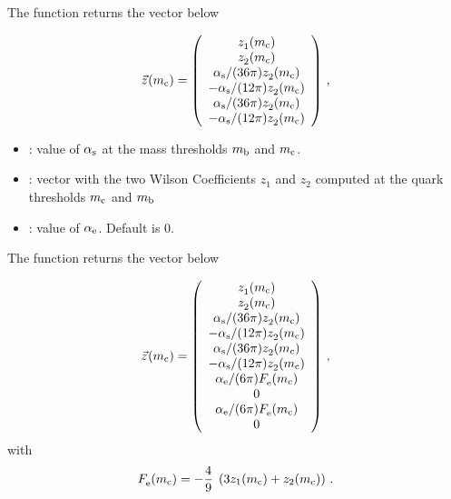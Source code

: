 The function  returns the vector below

\begin{equation}
\vec{z}^{\rm }(m_{\mathrm c}) =
\left( \begin{array}{c}
z_1^{\rm }(m_{\mathrm c}) \\ z_2^{\rm }(m_{\mathrm c}) \\
\alpha_{\rm s}/(36\pi) z_2^{\rm }(m_{\mathrm c}) \\
-\alpha_{\rm s}/(12 \pi) z_2^{\rm }(m_{\mathrm c}) \\
\alpha_{\rm s}/(36\pi) z_2^{\rm }(m_{\mathrm c}) \\
-\alpha_{\rm s}/(12 \pi) z_2^{\rm }(m_{\mathrm c}) 
\end{array} \right) \, ,
\label{eq:zmc:1010}
\end{equation}


\begin{itemize}
\item {}: value of $\alpha_{\rm s}$ at the mass thresholds $m_{\mathrm b}$ and $m_{\mathrm c}$.
\item {}: vector with the two Wilson Coefficients $z_1$ and $z_2$ computed at the
quark thresholds $m_{\mathrm c}$ and $m_{\mathrm b}$
\item {}: value of $\alpha_{\rm e}$. Default is 0.
\end{itemize}

The function  returns the vector below 

\begin{equation}
\vec{z}^{\rm }(m_{\mathrm c}) =
\left( \begin{array}{c}
z_1^{\rm }(m_{\mathrm c}) \\ z_2^{\rm }(m_{\mathrm c}) \\
\alpha_{\rm s}/(36\pi) z_2^{\rm }(m_{\mathrm c}) \\
-\alpha_{\rm s}/(12 \pi) z_2^{\rm }(m_{\mathrm c}) \\
\alpha_{\rm s}/(36\pi) z_2^{\rm }(m_{\mathrm c}) \\
-\alpha_{\rm s}/(12 \pi) z_2^{\rm }(m_{\mathrm c}) \\
\alpha_{\rm e}/(6\pi) F_{\rm e}^{\rm }(m_{\mathrm c}) \\  0  \\
\alpha_{\rm e}/(6\pi) F_{\rm e}^{\rm }(m_{\mathrm c}) \\  0
\end{array} \right) \, ,
\label{eq:zmc:1010}
\end{equation}
with 
\begin{equation}
F_{\rm e}^{\rm }(m_{\mathrm c}) =
-\frac{4}{9} \; \left( 3 z_1(m_{\mathrm c}) + z_2(m_{\mathrm c}) \right) \, .
\label{eq:Femc}
\end{equation}



